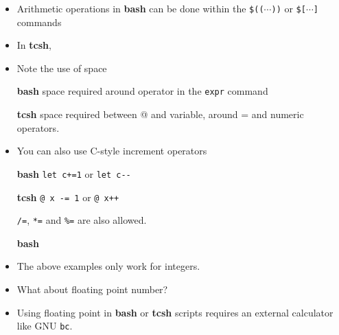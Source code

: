 \documentclass[slidestop,mathserif,compress,xcolor=svgnames]{beamer}
\begin{document}
\begin{frame}
\begin{itemize}
    \item Arithmetic operations in \textbf{bash} can be done within the \texttt{\$(($\cdots$))} or \texttt{\$[$\cdots$]} commands
    \framebreak
    \item In \textbf{tcsh},
    \item Note the use of space
    \item[\textbf{bash}] space required around operator in the \texttt{expr} command
    \item[\textbf{tcsh}] space required between @ and variable, around = and numeric operators. 
    \item You can also use C-style increment operators
    \item[\textbf{bash}] \texttt{let c+=1} or \texttt{let c-{}-}
    \item[\textbf{tcsh}] \texttt{@ x -= 1} or \texttt{@ x++}
    \item[] \texttt{/=}, \texttt{*=} and \texttt{\%=} are also allowed.
    \item[\textbf{bash}]
    \item The above examples only work for integers.
    \item What about floating point number?
    \framebreak
    \item Using floating point in \textbf{bash} or \textbf{tcsh} scripts requires an external calculator like GNU \texttt{bc}.
    \begin{enumerate}

\end{enumerate}
\end{itemize}
\end{frame}
\end{document}
